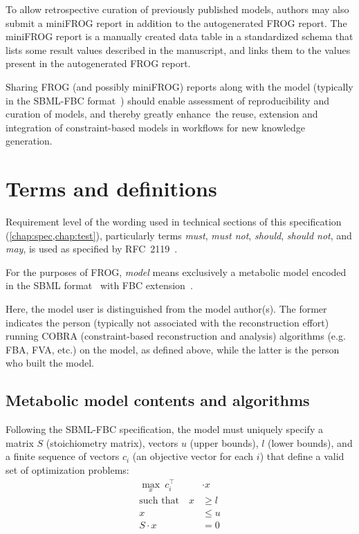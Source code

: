 To allow retrospective curation of previously published models, authors may also submit a miniFROG report in addition to the autogenerated FROG report. The miniFROG report is a manually created data table in a standardized schema that lists some result values described in the manuscript, and links them to the values present in the autogenerated FROG report.

Sharing FROG (and possibly miniFROG) reports along with the model (typically in the SBML-FBC format~\cite{olivier2018sbmlfbc}) should enable assessment of reproducibility and curation of models, and thereby greatly enhance the reuse, extension and integration of constraint-based models in workflows for new knowledge generation. 

\section{Terms and definitions}

Requirement level of the wording used in technical sections of this specification (\cref{chap:spec,chap:test}), particularly terms \emph{must}, \emph{must not}, \emph{should}, \emph{should not}, and \emph{may}, is used as specified by RFC~2119~\cite{rfc2119}.

For the purposes of FROG, \emph{model} means exclusively a metabolic model encoded in the SBML format~\cite{hucka2003systems,keating2020sbml} with FBC extension~\cite{olivier2018sbmlfbc}.

Here, the model user is distinguished from the model author(s). The former
indicates the person (typically not associated with the reconstruction effort)
running COBRA (constraint-based reconstruction and analysis) algorithms (e.g.
FBA, FVA, etc.) on the model, as defined above, while the latter is the
person who built the model. 

\subsection{Metabolic model contents and algorithms}
\label{sec:algos}

Following the SBML-FBC specification, the model must uniquely specify a matrix $S$ (stoichiometry matrix), vectors $u$ (upper bounds), $l$ (lower bounds), and a finite sequence of vectors $c_i$ (an objective vector for each $i$) that define a valid set of optimization problems:
\begin{align*}
\max_x\ c_i^\intercal &\cdot x \\
\text{such that}\quad
x & \geq l \\
x & \leq u \\
S\cdot x &= 0
\end{align*}

